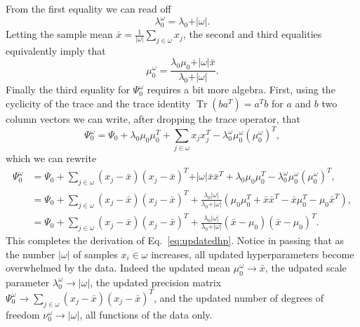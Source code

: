\documentclass[11pt, oneside]{article}   	%
\DeclareMathOperator{\Tr}{Tr}
\begin{document}
From the first equality we can read off
$$\lambda_0^\omega = \lambda_0 + \vert\omega\vert.$$
Letting the sample mean $\bar x = \frac{1}{\vert\omega\vert}\sum_{j\in\omega}x_j$, the second and third equalities equivalently imply that
$$\mu_0^\omega = \frac{\lambda_0\mu_0 + \vert\omega\vert\bar x}{\lambda_0 + \vert\omega\vert}.$$
Finally the third equality for $\Psi_0^\omega$ requires a bit more algebra. First, using the cyclicity of the trace and the trace identity $\Tr(b a^T) = a^T b$ for $a$ and $b$ two column vectors we can write, after dropping the trace operator, that
\begin{equation}
\Psi_0^\omega = \Psi_0 + \lambda_0\mu_0\mu_0^T + \sum_{j\in\omega} x_j x_j^T - \lambda_0^\omega\mu_0^\omega(\mu_0^\omega)^T,
\end{equation}
which we can rewrite
\begin{equation}\begin{split}
\Psi_0^\omega &= \Psi_0 + \sum_{j\in\omega}(x_j  - \bar x) (x_j - \bar x)^T + \vert\omega\vert\bar x\bar x^T + \lambda_0\mu_0\mu_0^T -\lambda_0^\omega \mu_0^\omega(\mu_0^\omega)^T,\\
&= \Psi_0 + \sum_{j\in\omega}(x_j  - \bar x) (x_j - \bar x)^T + \frac{\lambda_0 \vert\omega\vert}{\lambda_0 + \vert\omega\vert}\left(\mu_0\mu_0^T + \bar x\bar x^T - \bar x\mu_0^T - \mu_0 \bar x^T\right),\\
&= \Psi_0 +  \sum_{j\in\omega}(x_j  - \bar x) (x_j - \bar x)^T + \frac{\lambda_0 \vert\omega\vert}{\lambda_0 + \vert\omega\vert}(\bar x - \mu_0)(\bar x - \mu_0)^T.
\end{split}\end{equation}
This completes the derivation of Eq.~\ref{eq:updatedhp}. Notice in passing that as the number $\vert\omega\vert$ of samples $x_i\in\omega$ increases, all updated hyperparameters become overwhelmed by the data. Indeed the updated mean $\mu_0^\omega \rightarrow \bar x$, the udpated scale parameter $\lambda_0^\omega \rightarrow \vert\omega\vert$, the updated precision matrix $\Psi_0^\omega\rightarrow \sum_{j\in\omega}(x_j - \bar x)(x_j - \bar x)^T$, and the updated number of degrees of freedom $\nu_0^\omega \rightarrow \vert\omega\vert$, all functions of the data only.
\end{document}
